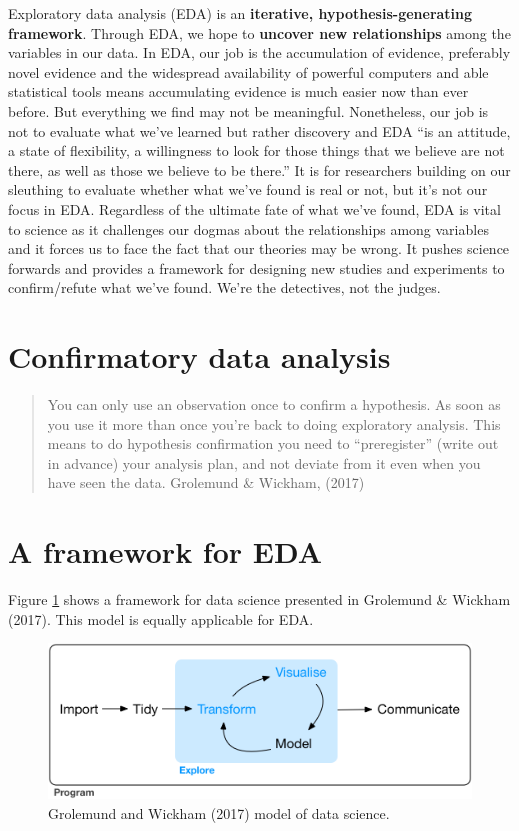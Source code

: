 \documentclass[]{book}
\begin{document}
Exploratory data analysis (EDA) is an \textbf{iterative, hypothesis-generating framework}. Through EDA, we hope to \textbf{uncover new relationships} among the variables in our data. In EDA, our job is the accumulation of evidence, preferably novel evidence and the widespread availability of powerful computers and able statistical tools means accumulating evidence is much easier now than ever before. But everything we find may not be meaningful. Nonetheless, our job is not to evaluate what we've learned but rather discovery and EDA ``is an attitude, a state of flexibility, a willingness to look for those things that we believe are not there, as well as those we believe to be there.'' It is for researchers building on our sleuthing to evaluate whether what we've found is real or not, but it's not our focus in EDA. Regardless of the ultimate fate of what we've found, EDA is vital to science as it challenges our dogmas about the relationships among variables and it forces us to face the fact that our theories may be wrong. It pushes science forwards and provides a framework for designing new studies and experiments to confirm/refute what we've found. We're the detectives, not the judges.

\hypertarget{confirmatory-data-analysis}{%
\section{Confirmatory data analysis}\label{confirmatory-data-analysis}}

\begin{quote}
You can only use an observation once to confirm a hypothesis. As soon as you use it more than once you're back to doing exploratory analysis. This means to do hypothesis confirmation you need to ``preregister'' (write out in advance) your analysis plan, and not deviate from it even when you have seen the data. Grolemund \& Wickham, (2017)
\end{quote}

\hypertarget{a-framework-for-eda}{%
\section{A framework for EDA}\label{a-framework-for-eda}}

Figure \ref{fig:edamod} shows a framework for data science presented in Grolemund \& Wickham (2017). This model is equally applicable for EDA.

\begin{figure}
\includegraphics[width=0.8\linewidth]{images/datascienceexplore} \caption{Grolemund and Wickham (2017) model of data science.}\label{fig:edamod}
\end{figure}
\end{document}
